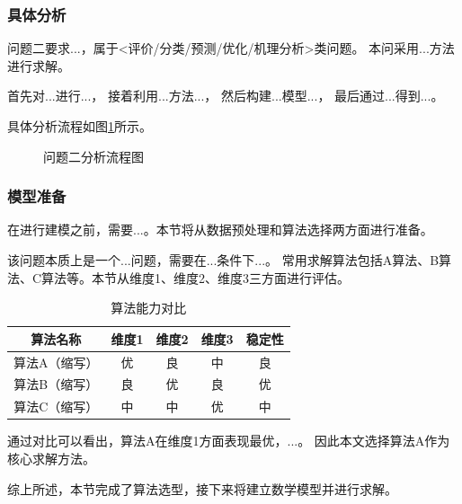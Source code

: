 
\subsubsection{具体分析}

问题二要求...，属于<评价/分类/预测/优化/机理分析>类问题。
本问采用...方法进行求解。

首先对...进行...，
接着利用...方法...，
然后构建...模型...，
最后通过...得到...。

具体分析流程如图\ref{fig:analysis2_flow}所示。

\begin{figure}[H]
  \begin{center}
    \caption{问题二分析流程图}
    \label{fig:analysis2_flow}
  \end{center}
\end{figure}

\subsubsection{模型准备}

在进行建模之前，需要...。本节将从数据预处理和算法选择两方面进行准备。

该问题本质上是一个...问题，需要在...条件下...。
常用求解算法包括A算法、B算法、C算法等。本节从维度1、维度2、维度3三方面进行评估。

\begin{table}[H]
  \centering
  \caption{算法能力对比}
  \begin{tabularx}{\textwidth}{CCCCC}
    \toprule
    算法名称 & 维度1 & 维度2 & 维度3 & 稳定性 \\
    \midrule
    算法A（缩写） & 优 & 良 & 中 & 良 \\
    算法B（缩写） & 良 & 优 & 良 & 优 \\
    算法C（缩写） & 中 & 中 & 优 & 中 \\
    \bottomrule
  \end{tabularx}
  \label{tab:算法对比2}
\end{table}

通过对比可以看出，算法A在维度1方面表现最优，...。
因此本文选择算法A作为核心求解方法。

综上所述，本节完成了算法选型，接下来将建立数学模型并进行求解。
